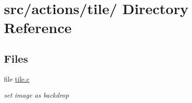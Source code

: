 \hypertarget{dir_000045}{
\section{src/actions/tile/ Directory Reference}
\label{dir_000045}
}
\subsection*{Files}
\begin{CompactItemize}
\item 
file \hyperlink{tile_8c}{tile.c}
\begin{CompactList}\small\item\em set image as backdrop \item\end{CompactList}

\end{CompactItemize}
